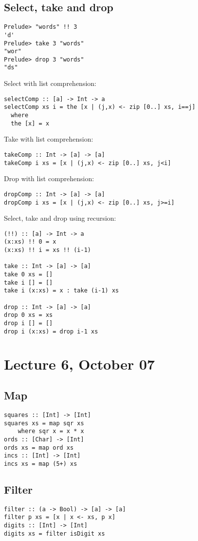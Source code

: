 \documentclass{article}
\begin{document}
\subsection{Select, take and drop}
\begin{verbatim}
Prelude> "words" !! 3
'd'
Prelude> take 3 "words"
"wor"
Prelude> drop 3 "words"
"ds"
\end{verbatim}
Select with list comprehension:
\begin{verbatim}
selectComp :: [a] -> Int -> a
selectComp xs i = the [x | (j,x) <- zip [0..] xs, i==j]
  where
  the [x] = x
\end{verbatim}
Take with list comprehension:
\begin{verbatim}
takeComp :: Int -> [a] -> [a]
takeComp i xs = [x | (j,x) <- zip [0..] xs, j<i]
\end{verbatim}
Drop with list comprehension:
\begin{verbatim}
dropComp :: Int -> [a] -> [a]
dropComp i xs = [x | (j,x) <- zip [0..] xs, j>=i]
\end{verbatim}
Select, take and drop using recursion:
\begin{verbatim}
(!!) :: [a] -> Int -> a
(x:xs) !! 0 = x
(x:xs) !! i = xs !! (i-1)

take :: Int -> [a] -> [a]
take 0 xs = []
take i [] = []
take i (x:xs) = x : take (i-1) xs

drop :: Int -> [a] -> [a]
drop 0 xs = xs
drop i [] = []
drop i (x:xs) = drop i-1 xs
\end{verbatim}
\section{Lecture 6, October 07}
\subsection{Map}
\begin{verbatim}
squares :: [Int] -> [Int]
squares xs = map sqr xs
    where sqr x = x * x
ords :: [Char] -> [Int]
ords xs = map ord xs
incs :: [Int] -> [Int]
incs xs = map (5+) xs
\end{verbatim}
\subsection{Filter}
\begin{verbatim}
filter :: (a -> Bool) -> [a] -> [a]
filter p xs = [x | x <- xs, p x]
digits :: [Int] -> [Int]
digits xs = filter isDigit xs
\end{verbatim}
\end{document}
